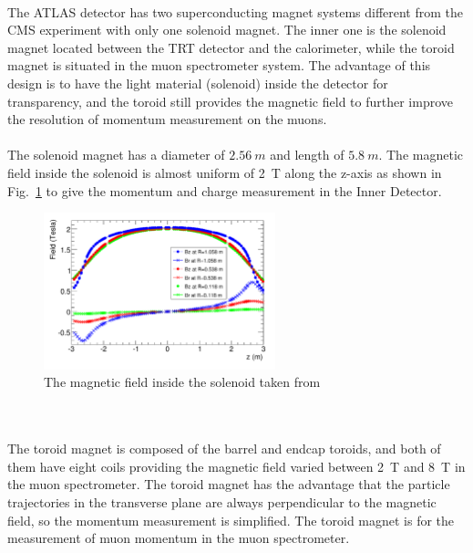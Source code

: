 \\ The ATLAS detector has two superconducting magnet systems different from the CMS experiment with only one solenoid magnet. The inner one is the solenoid magnet located between the TRT detector and the calorimeter, while the toroid magnet is situated in the muon spectrometer system. The advantage of this design is to have the light material (solenoid) inside the detector for transparency, and the toroid still provides the magnetic field to further improve the resolution of momentum measurement\cite{magnets} on the muons.  
\\
\\The solenoid magnet has a diameter of $2.56~m$ and length of $5.8~m$.  The magnetic field inside the solenoid is almost uniform of 2~T along the z-axis as shown in Fig.~\ref{Fig:bfield} to give the momentum and charge measurement in the Inner Detector. 
\begin{figure}[!h]                
	\includegraphics[width=0.6\textwidth]{Chapter2/bfield}
	\centering
	\begin{center}
		\caption{The magnetic field inside the solenoid taken from \cite{Aleksa_2008}}
		\label{Fig:bfield}            
	\end{center}
\end{figure}
\\
\\The toroid magnet is composed of the barrel and endcap toroids, and both of them have eight coils providing the magnetic field varied between 2~T and 8~T in the muon spectrometer. The toroid magnet has the advantage that the particle trajectories in the transverse plane are always perpendicular to the magnetic field, so the momentum measurement is simplified. The toroid magnet is for the measurement of muon momentum in the muon spectrometer. 
